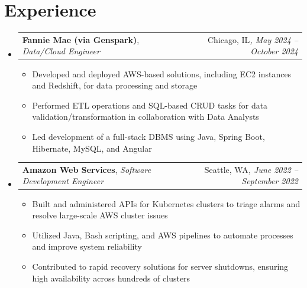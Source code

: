 \documentclass[a4paper,11pt]{article}
\makeatletter
\newcommand{\resumeSubheadingalt}[4]{
\vspace{0.5mm}\item %
    \begin{tabular*}{0.98\textwidth}[t]{l@{\extracolsep{\fill}}r}
        \textbf{#1}, \textit{\footnotesize{#3}} &  \footnotesize{#2}\textit{\footnotesize{, #4}} \\
   
    \end{tabular*}
    \vspace{-2.4mm} %
}
\newenvironment{resumeSubHeadingList}{\begin{itemize}[leftmargin=*,labelsep=1.2mm, label={}]}{\end{itemize}\vspace{2mm}} %
\newenvironment{resumeItemList}{\begin{justify}\begin{itemize}[leftmargin=3ex, rightmargin=2ex, noitemsep,labelsep=1.2mm,itemsep=0mm]\small}{\end{itemize}\end{justify}\vspace{-2mm}}  %
\newcommand{\bulletend}{}
\makeatother
\begin{document}
\section{\textbf{Experience}}
\vspace{-0.0pt} %
\begin{resumeSubHeadingList}
    \resumeSubheadingalt{Fannie Mae (via Genspark)}{Chicago, IL}
    {Data/Cloud Engineer}{May 2024 -- October 2024}
    \vspace{-1.0mm} %
    \begin{resumeItemList}
        \item{Developed and deployed AWS-based solutions, including EC2 instances and Redshift, for data processing and storage\bulletend}
        \item{Performed ETL operations and SQL-based CRUD tasks for data validation/transformation in collaboration with Data Analysts\bulletend}
        \item{Led development of a full-stack DBMS using Java, Spring Boot, Hibernate, MySQL, and Angular\bulletend}
    \end{resumeItemList}
    \vspace{-3.0mm} %
    \resumeSubheadingalt{Amazon Web Services}{Seattle, WA}
    {Software Development Engineer}{June 2022 -- September 2022}
    \vspace{-1.0mm} %
    \begin{resumeItemList}
        \item {Built and administered APIs for Kubernetes clusters to triage alarms and resolve large-scale AWS cluster issues\bulletend}
        \item {Utilized Java, Bash scripting, and AWS pipelines to automate processes and improve system reliability\bulletend}
        \item {Contributed to rapid recovery solutions for server shutdowns, ensuring high availability across hundreds of clusters\bulletend}
    \end{resumeItemList}
    \vspace{-3.0mm} %

\end{resumeSubHeadingList}
\end{document}
